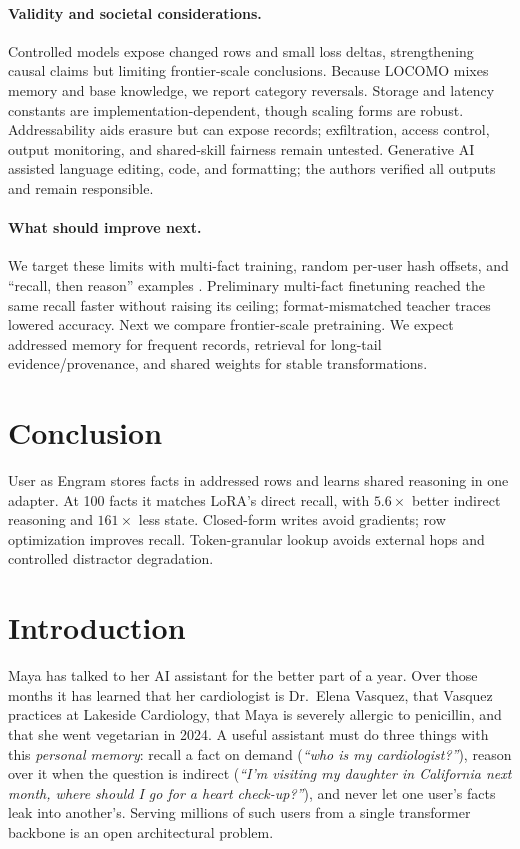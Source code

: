 \documentclass[letterpaper]{article} %
\begin{document}
\paragraph{Validity and societal considerations.}
Controlled models expose changed rows and small loss deltas, strengthening
causal claims but limiting frontier-scale conclusions. Because LOCOMO mixes
memory and base knowledge, we report category reversals. Storage and latency
constants are implementation-dependent, though scaling forms are robust.
Addressability aids erasure but can expose records; exfiltration, access
control, output monitoring, and shared-skill fairness remain untested.
Generative AI assisted language editing, code, and formatting; the authors
verified all outputs and remain responsible.

\paragraph{What should improve next.}
We target these limits with multi-fact training, random per-user hash offsets,
and ``recall, then reason'' examples
\citep{sun2023recitation}. Preliminary multi-fact finetuning reached the same
recall faster without raising its ceiling; format-mismatched teacher traces
lowered accuracy. Next we compare frontier-scale pretraining. We expect
addressed memory for frequent records, retrieval for long-tail
evidence/provenance, and shared weights for stable transformations.

\section{Conclusion}

User as Engram stores facts in addressed rows and learns shared reasoning in
one adapter. At 100 facts it matches LoRA's direct recall, with $5.6\times$ better
indirect reasoning and $161\times$ less state. Closed-form writes avoid
gradients; row optimization improves recall. Token-granular lookup avoids
external hops and controlled distractor degradation.

\iffalse
\section{Introduction}
\label{sec:intro}

Maya has talked to her AI assistant for the better part of a
year. Over those months it has learned that her cardiologist is
Dr.~Elena Vasquez, that Vasquez practices at Lakeside
Cardiology, that Maya is severely allergic to penicillin, and
that she went vegetarian in 2024. A useful assistant must do
three things with this \emph{personal memory}: recall a fact on
demand (\emph{``who is my cardiologist?''}), reason over it when
the question is indirect (\emph{``I'm visiting my daughter in
California next month, where should I go for a heart
check-up?''}), and never let one user's facts leak into
another's. Serving millions of such users from a single
transformer~\citep{vaswani2017transformer} backbone is an open
architectural problem.
\end{document}
